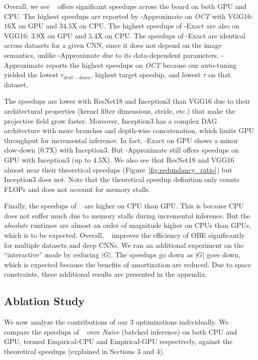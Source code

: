 Overall, we see \system~ offers significant speedups across the board on both GPU and CPU. The highest speedups are reported by \system-Approximate on \textit{OCT} with VGG16: $16$X on GPU and $34.5$X on CPU. The highest speedups of  \system-Exact are also on VGG16: $3.9$X on GPU and $5.4$X on CPU. The speedups of \system-Exact are identical across datasets for a given CNN, since it does not depend on the image semantics, unlike \system-Approximate due to its data-dependent parameters. \system-Approximate reports the highest speedups on \textit{OCT} because our auto-tuning yielded the lowest $r_{drill-down}$, highest target speedup, and lowest $\tau$ on that dataset. 

The speedups are lower with ResNet18 and Inception3 than VGG16 due to their architectural properties (kernel filter dimensions, stride, etc.) that make the projective field grow faster. Moreover, Inception3 has a complex DAG architecture with more branches and depth-wise concatenation, which limits GPU throughput for incremental inference. In fact, \system-Exact on GPU shows a minor slow-down ($0.7$X) with Inception3. But \system-Approximate still offers speedups on GPU with Inception3 (up to $4.5$X). We also see that ResNet18 and VGG16 almost near their theoretical speedups (Figure~\ref{fig:redundancy_ratio}) but Inception3 does not. Note that the theoretical speedup definition only counts FLOPs and does not account for memory stalls.

Finally, the speedups of \system~ are higher on CPU than GPU. This is because CPU does not suffer much due to memory stalls during incremental inference. But the \textit{absolute} runtimes are almost an order of magnitude higher on CPUs than GPUs, which is to be expected. Overall, \system~ improves the efficiency of OBE significantly for multiple datasets and deep CNNs. We ran an additional experiment on the ``interactive'' mode by reducing $|G|$. The speedups go down as $|G|$ goes down, which is expected because the benefits of amortization are reduced. Due to space constraints, these additional results are presented in the appendix.

\vspace{-2mm}
\subsection{Ablation Study}
We now analyze the contributions of our 3 optimizations individually. We compare the speedups of \system~ over \textit{Naive} (batched inference) on both CPU and GPU, termed  Empirical-CPU and Empirical-GPU respectively, against the theoretical speedups (explained in Sections 3 and 4).

